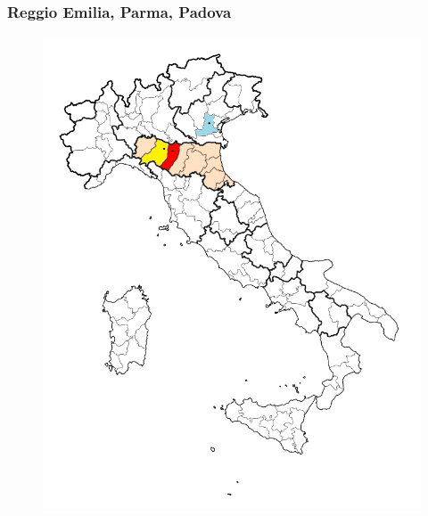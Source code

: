 \begin{frame}
\frametitle{Reggio Emilia, Parma, Padova} 
\begin{center}
\begin{figure}
\includegraphics[height=1.0\textheight]{include/3-cities-map.png}
\end{figure}
\end{center}
\end{frame}

